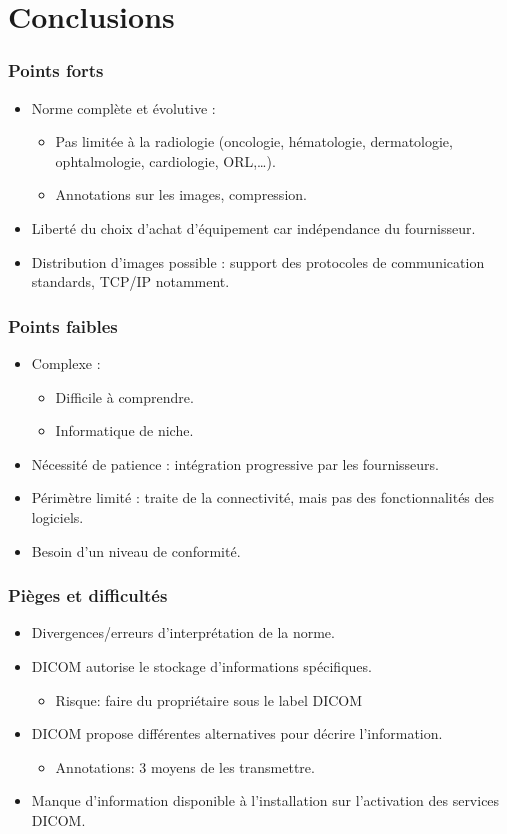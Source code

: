 \section{Conclusions}

\frame
{
	\frametitle{Points forts}
	\begin{itemize}
		\item Norme compl\`ete et \'evolutive :
		\begin{itemize}
			\item Pas limit\'ee \`a la radiologie (oncologie, h\'ematologie, dermatologie, ophtalmologie, cardiologie, ORL,\ldots).
			\item Annotations sur les images, compression.
		\end{itemize}
		\item Libert\'e du choix d'achat d'\'equipement car ind\'ependance du fournisseur.
		\item Distribution d'images possible : support des protocoles de communication standards, TCP/IP notamment.
	\end{itemize}
}

\frame
{
	\frametitle{Points faibles}
	\begin{itemize}
		\item Complexe :
		\begin{itemize}
			\item Difficile \`a comprendre.
			\item Informatique de niche.
		\end{itemize}
		\item N\'ecessit\'e de patience : int\'egration progressive par les fournisseurs.
		\item P\'erim\`etre limit\'e : traite de la connectivit\'e, mais pas des fonctionnalit\'es des logiciels.
		\item Besoin d'un niveau de conformit\'e.
	\end{itemize}
}

\frame
{
	\frametitle{Pi\`eges et difficult\'es}
	\begin{itemize}
		\item Divergences/erreurs d'interpr\'etation de la norme.
		\item DICOM autorise le stockage d'informations sp\'ecifiques.
		\begin{itemize}
			\item Risque: faire du propri\'etaire sous le label DICOM
		\end{itemize}
		\item DICOM propose diff\'erentes alternatives pour d\'ecrire l'information.
		\begin{itemize}
			\item Annotations: 3 moyens de les transmettre.
		\end{itemize}
		\item Manque d'information disponible \`a l'installation sur l'activation des services DICOM.
	\end{itemize}
}

